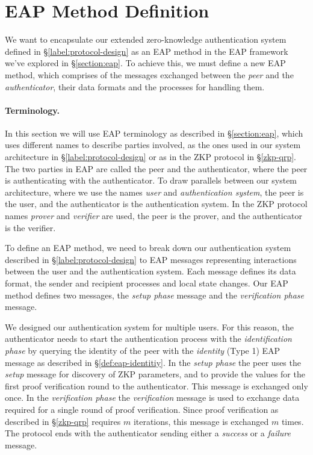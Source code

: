 \section{EAP Method Definition}
\label{section:eap-84-definition}
We want to encapsulate our extended zero-knowledge authentication system defined in \S\ref{label:protocol-design} as an EAP method in the EAP framework we've explored in \S\ref{section:eap}.
To achieve this, we must define a new EAP method, which comprises of the messages exchanged between the \textit{peer} and the \textit{authenticator}, their data formats and the processes for handling them.

\paragraph{Terminology.}
In this section we will use EAP terminology as described in \S\ref{section:eap}, which uses different names to describe parties involved, as the ones used in our system architecture in \S\ref{label:protocol-design} or as in the ZKP protocol in \S\ref{zkp-qrp}.
The two parties in EAP are called the peer and the authenticator, where the peer is authenticating with the authenticator.
To draw parallels between our system architecture, where we use the names \textit{user} and \textit{authentication system}, the peer is the user, and the authenticator is the authentication system.
In the ZKP protocol names \textit{prover} and \textit{verifier} are used, the peer is the prover, and the authenticator is the verifier.

\bigskip
\noindent
To define an EAP method, we need to break down our authentication system described in \S\ref{label:protocol-design} to EAP messages representing interactions between the user and the authentication system.
Each message defines its data format, the sender and recipient processes and local state changes.
Our EAP method defines two messages, the \textit{setup phase} message and the \textit{verification phase} message.

We designed our authentication system for multiple users. 
For this reason, the authenticator needs to start the authentication process with the \textit{identification phase} by querying the identity of the peer with the \textit{identity} (Type 1) EAP message as described in \S\ref{def:eap-identitiy}.
In the \textit{setup phase} the peer uses the \textit{setup} message for discovery of ZKP parameters, and to provide the values for the first proof verification round to the authenticator.
This message is exchanged only once.
In the \textit{verification phase} the \textit{verification} message is used to exchange data required for a single round of proof verification. Since proof verification as described in \S\ref{zkp-qrp} requires $m$ iterations, this message is exchanged $m$ times.
The protocol ends with the authenticator sending either a \textit{success} or a \textit{failure} message.

